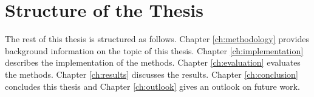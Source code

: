 \section{Structure of the Thesis}\label{sec:structure-of-the-thesis}
The rest of this thesis is structured as follows.
Chapter \ref{ch:methodology} provides background information on the topic of this thesis.
Chapter \ref{ch:implementation} describes the implementation of the methods.
Chapter \ref{ch:evaluation} evaluates the methods.
Chapter \ref{ch:results} discusses the results.
Chapter \ref{ch:conclusion} concludes this thesis and 
Chapter \ref{ch:outlook} gives an outlook on future work.